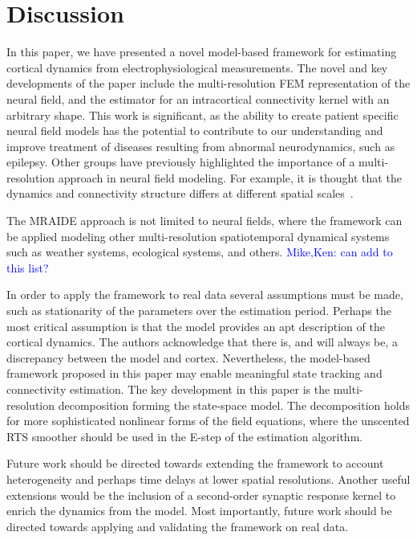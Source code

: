 \documentclass[journal]{IEEEtran}
\newcommand{\parham}[1]{\textcolor{blue}{#1}}
\begin{document}
\section{Discussion}
In this paper, we have presented a novel model-based framework for estimating cortical dynamics from electrophysiological measurements. The novel and key developments of the paper include the multi-resolution FEM representation of the neural field, and the estimator for an intracortical connectivity kernel with an arbitrary shape. This work is significant, as the ability to create patient specific neural field models has the potential to contribute to our understanding and improve treatment of diseases resulting from abnormal neurodynamics, such as epilepsy. Other groups have previously highlighted the importance of a multi-resolution approach in neural field modeling. For example, it is thought that the dynamics and connectivity structure differs at different spatial scales~\cite{Qubbaj2009}.

The MRAIDE approach is not limited to neural fields, where the framework can be applied modeling other multi-resolution spatiotemporal dynamical systems such as weather systems, ecological systems, and others\cite{Wikle2002,Xu2005,Fort2008}. \parham{Mike,Ken: can add to this list?}

In order to apply the framework to real data several assumptions must be made, such as stationarity of the parameters over the estimation period. Perhaps the most critical assumption is that the model provides an apt description of the cortical dynamics. The authors acknowledge that there is, and will always be, a discrepancy between the model and cortex. Nevertheless, the model-based framework proposed in this paper may enable meaningful state tracking and connectivity estimation. The key development in this paper is the multi-resolution decomposition forming the state-space model. The decomposition holds for more sophisticated nonlinear forms of the field equations, where the unscented RTS smoother should be used in the E-step of the estimation algorithm. 

Future work should be directed towards extending the framework to account heterogeneity and perhaps time delays at lower spatial resolutions. Another useful extensions would be the inclusion of a second-order synaptic response kernel to enrich the dynamics from the model. Most importantly, future work should be directed towards applying and validating the framework on real data.


\ifCLASSOPTIONcaptionsoff
  \newpage
\fi

%  
% 


 
\end{document}
